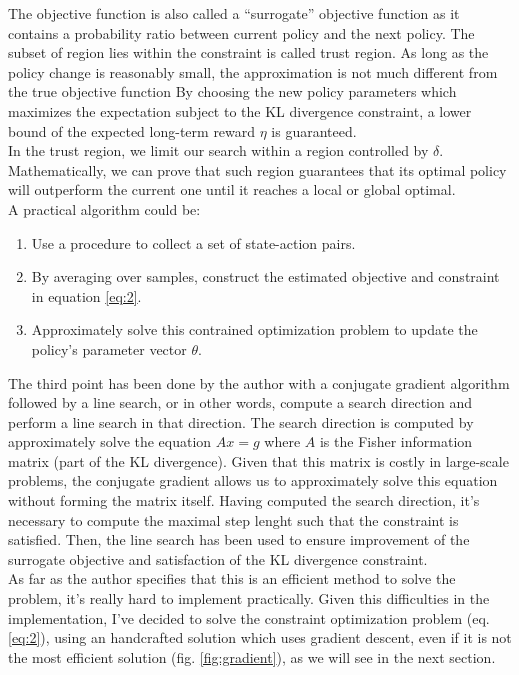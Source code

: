\documentclass[11pt]{article}
\begin{document}
The objective function is also called a “surrogate” objective function as it contains a
probability ratio between current policy and the next policy. The subset of region lies
within the constraint is called trust region. As long as the policy change is reasonably
small, the approximation is not much different from the true objective function By
choosing the new policy parameters which maximizes the expectation subject to the KL
divergence constraint, a lower bound of the expected long-term reward $\eta$ is guaranteed.
\\
In the trust region, we limit our search within a region controlled by $\delta$.
Mathematically, we can prove that such region guarantees that its optimal policy will
outperform the current one until it reaches a local or global optimal.
\\
A practical algorithm could be:

\begin{enumerate}
        \item Use a procedure to collect a set of state-action pairs.
        \item By averaging over samples, construct the estimated objective and constraint
        in equation \ref{eq:2}.
        \item Approximately solve this contrained optimization problem to update the
        policy's parameter vector $\theta$.

\end{enumerate}
The third point has been done by the author with a conjugate gradient algorithm followed
by a line search, or in other words, compute a search direction and perform a line search
in that direction.
The search direction is computed by approximately solve the equation $Ax = g$ where $A$ is
the Fisher information matrix (part of the KL divergence). Given that this matrix is
costly in large-scale problems, the conjugate gradient allows us to approximately solve
this equation without forming the matrix itself.
Having computed the search direction, it's necessary to compute the maximal step lenght
such that the constraint is satisfied.
Then, the line search has been used to ensure improvement of the surrogate objective and
satisfaction of the KL divergence constraint.
\\
As far as the author specifies that this is an efficient method to solve the problem, it's
really hard to implement practically. Given this difficulties in the implementation, I've
decided to solve the constraint optimization problem (eq. \ref{eq:2}), using an
handcrafted solution which uses gradient descent, even if it is not the most efficient
solution (fig. \ref{fig:gradient}), as we will see in the next section.
\end{document}

